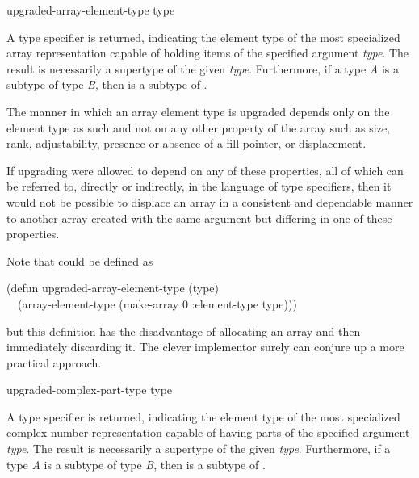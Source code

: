 \begin{defun}[Function]
upgraded-array-element-type type

A type specifier is returned, indicating the element type
of the most specialized array representation capable of holding
items of the specified argument \emph{type}.
The result is necessarily a supertype of the given \emph{type}.
Furthermore, if a type \emph{A} is a subtype of type \emph{B}, then
 is a subtype of
.

The manner in which an array element type is upgraded depends
only on the element type as such and not on any other property of
the array such as size, rank, adjustability,
presence or absence of a fill pointer, or displacement.

\beforenoterule
\begin{rationale}
If upgrading were allowed to depend on any of these properties,
all of which can be referred to, directly or indirectly, in the
language of type specifiers, then it would not be possible
to displace an array in a consistent and dependable manner
to another array created with the same  argument
but differing in one of these properties.
\end{rationale}
\afternoterule

Note that  could be defined as
\begin{lisp}
(defun upgraded-array-element-type (type) \\
~~(array-element-type (make-array 0 :element-type type)))
\end{lisp}
but this definition has the disadvantage of allocating an array and
then immediately discarding it.  The clever implementor surely can
conjure up a more practical approach.
\end{defun}


\begin{defun}[Function]
upgraded-complex-part-type type

A type specifier is returned, indicating the element type
of the most specialized complex number representation capable of having
parts of the specified argument \emph{type}.
The result is necessarily a supertype of the given \emph{type}.
Furthermore, if a type \emph{A} is a subtype of type \emph{B}, then
 is a subtype of
.
\end{defun}

